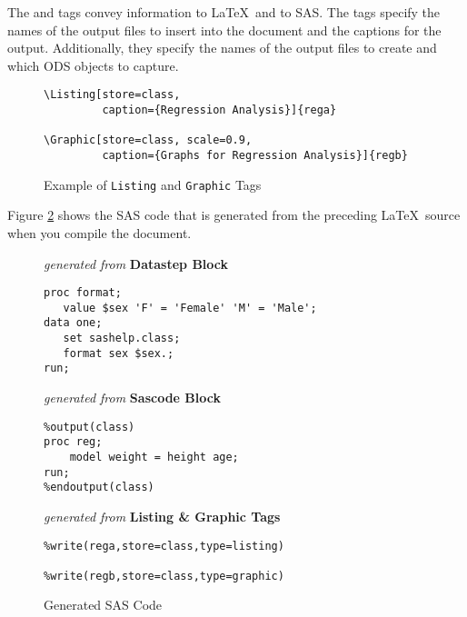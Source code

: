 \documentclass[article,oneside]{memoir}
\begin{document}
  The  and  tags convey information to \LaTeX\ and to SAS.
  The tags specify the names of the output files to insert into the document
  and the captions for the output.
  Additionally, they specify the names of the output files to create and which
  ODS objects to capture.

\begin{figure}[H]
\begin{snugshade}
\begin{verbatim}
\Listing[store=class,
         caption={Regression Analysis}]{rega}

\Graphic[store=class, scale=0.9,
         caption={Graphs for Regression Analysis}]{regb}
\end{verbatim}
\end{snugshade}
\caption{Example of \texttt{Listing} and \texttt{Graphic} Tags}\label{fig:slg}
\end{figure}

  Figure \ref{fig:sgp} shows the SAS code that is generated
  from the preceding \LaTeX\ source when you compile the document.

\begin{figure}[H]
\begin{framed}
\begin{snugshade}
{\hfil\emph{generated from }\textbf{Datastep Block}\hfil}
\begin{verbatim}
proc format;
   value $sex 'F' = 'Female' 'M' = 'Male';
data one;
   set sashelp.class;
   format sex $sex.;
run;
\end{verbatim}
\end{snugshade}
\begin{snugshade}
{\hfil\emph{generated from }\textbf{Sascode Block}\hfil}
\begin{verbatim}
%output(class)
proc reg;
    model weight = height age;
run;
%endoutput(class)
\end{verbatim}
\end{snugshade}
\begin{snugshade}
{\hfil\emph{generated from }\textbf{Listing \& Graphic Tags}\hfil}
\begin{verbatim}
%write(rega,store=class,type=listing)

%write(regb,store=class,type=graphic)
\end{verbatim}
\end{snugshade}
\end{framed}
\caption{Generated SAS Code}\label{fig:sgp}
\end{figure}
\end{document}
